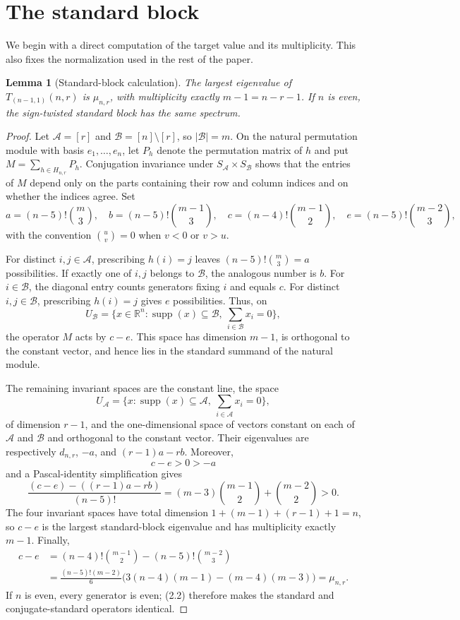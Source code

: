 \documentclass[11pt]{article}
\newtheorem{lemma}[theorem]{Lemma}
\theoremstyle{definition}
\newcommand{\R}{\mathbb R}
\newcommand{\supp}{\operatorname{supp}}
\begin{document}
\section{The standard block}

We begin with a direct computation of the target value and its multiplicity.
This also fixes the normalization used in the rest of the paper.

\begin{lemma}[Standard-block calculation]\label{lem:standard}
The largest eigenvalue of $T_{(n-1,1)}(n,r)$ is $\mu_{n,r}$, with
multiplicity exactly $m-1=n-r-1$.  If $n$ is even, the sign-twisted standard
block has the same spectrum.
\end{lemma}

\begin{proof}
Let $\mathcal A=[r]$ and $\mathcal B=[n]\setminus[r]$, so
$|\mathcal B|=m$.  On the natural permutation module with basis
$e_1,\dots,e_n$, let $P_h$ denote the permutation matrix of $h$ and put
$M=\sum_{h\in H_{n,r}}P_h$.  Conjugation invariance under
$S_{\mathcal A}\times S_{\mathcal B}$ shows that the entries of $M$ depend
only on the parts containing their row and column indices and on whether
the indices agree.  Set
\[
 a=(n-5)!\binom m3,\quad
 b=(n-5)!\binom{m-1}3,\quad
 c=(n-4)!\binom{m-1}2,\quad
 e=(n-5)!\binom{m-2}3,
 \tag{3.1}
\]
with the convention $\binom uv=0$ when $v<0$ or $v>u$.

For distinct $i,j\in\mathcal A$, prescribing $h(i)=j$ leaves
$(n-5)!\binom m3=a$ possibilities.  If exactly one of $i,j$ belongs to
$\mathcal B$, the analogous number is $b$.  For $i\in\mathcal B$, the
diagonal entry counts generators fixing $i$ and equals $c$.  For distinct
$i,j\in\mathcal B$, prescribing $h(i)=j$ gives $e$ possibilities.  Thus,
on
\[
 U_{\mathcal B}=\{x\in\R^n:\supp(x)\subseteq\mathcal B,
 \ \sum_{i\in\mathcal B}x_i=0\},
\]
the operator $M$ acts by $c-e$.  This space has dimension $m-1$, is
orthogonal to the constant vector, and hence lies in the standard summand of
the natural module.

The remaining invariant spaces are the constant line, the space
\[
 U_{\mathcal A}=\{x:\supp(x)\subseteq\mathcal A,
 \ \sum_{i\in\mathcal A}x_i=0\},
\]
of dimension $r-1$, and the one-dimensional space of vectors constant on
each of $\mathcal A$ and $\mathcal B$ and orthogonal to the constant vector.
Their eigenvalues are respectively $d_{n,r}$, $-a$, and
$(r-1)a-rb$.  Moreover,
\[
 c-e>0>-a
\]
and a Pascal-identity simplification gives
\[
 \frac{(c-e)-((r-1)a-rb)}{(n-5)!}
 =(m-3)\binom{m-1}{2}+\binom{m-2}{2}>0.
 \tag{3.2}
\]
The four invariant spaces have total dimension
$1+(m-1)+(r-1)+1=n$, so $c-e$ is the largest standard-block eigenvalue and
has multiplicity exactly $m-1$.  Finally,
\begin{align*}
 c-e
 &=(n-4)!\binom{m-1}{2}-(n-5)!\binom{m-2}{3}\\
 &=\frac{(n-5)!(m-2)}6
 \bigl(3(n-4)(m-1)-(m-4)(m-3)\bigr)
 =\mu_{n,r}.
\end{align*}
If $n$ is even, every generator is even; (2.2) therefore makes the standard
and conjugate-standard operators identical.
\end{proof}
\end{document}
